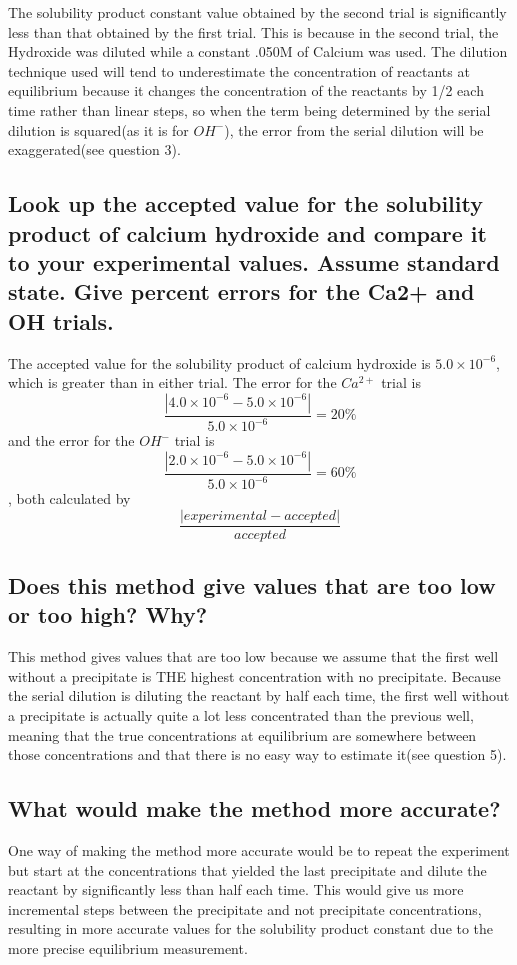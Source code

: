 \documentclass{article}
\begin{document}
The solubility product constant value obtained by the second trial is significantly less than that obtained by the first trial. This is because in the second trial, the Hydroxide was diluted while a constant .050M of Calcium was used.  The dilution technique used will tend to underestimate the concentration of reactants at equilibrium because it changes the concentration of the reactants by 1/2 each time rather than linear steps, so when the term being determined by the serial dilution is squared(as it is for $OH^-$), the error from the serial dilution will be exaggerated(see question 3).
\subsection {Look up the accepted value for the solubility product of calcium hydroxide and compare it to your experimental values. Assume standard state. Give percent errors for the Ca2+ and OH trials.}

The accepted value for the solubility product of calcium hydroxide is $5.0\times 10^{-6}$, which is greater than in either trial.  The error for the $Ca^{2+}$ trial is $$\frac{|4.0\times 10^{-6}-5.0\times 10^{-6}|}{5.0\times 10^{-6}}=20\%$$ and the error for the $OH^-$ trial is $$\frac{|2.0\times 10^{-6}-5.0\times 10^{-6}|}{5.0\times 10^{-6}}=60\%$$, both calculated by $$\frac{|experimental-accepted|}{accepted}$$
\subsection {Does this method give values that are too low or too high? Why?}

This method gives values that are too low because we assume that the first well without a precipitate is THE highest concentration with no precipitate.  Because the serial dilution is diluting the reactant by half each time, the first well without a precipitate is actually quite a lot less concentrated than the previous well, meaning that the true concentrations at equilibrium are somewhere between those concentrations and that there is no easy way to estimate it(see question 5).

\subsection {What would make the method more accurate?}

One way of making the method more accurate would be to repeat the experiment but start at the concentrations that yielded the last precipitate and dilute the reactant by significantly less than half each time.  This would give us more incremental steps between the precipitate and not precipitate concentrations, resulting in more accurate values for the solubility product constant due to 
the more precise equilibrium measurement.
\end{document}
